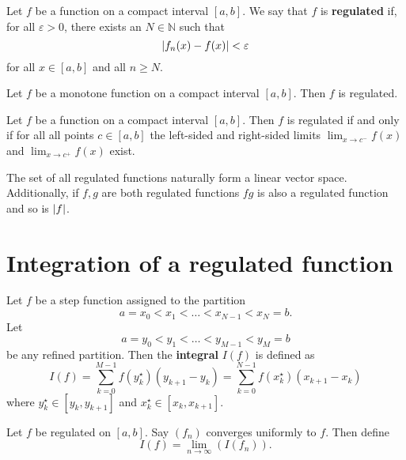 \begin{definition}
    Let $f$ be a function on a compact interval $[a, b]$. We say that $f$ is \textbf{regulated} if, for all $\varepsilon > 0$, there exists an $N \in \mathbb N$ such that \[ \lvert f_n(x) - f(x)\rvert < \varepsilon \] for all $x \in [a, b]$ and all $n \geq N$.
\end{definition}

\begin{proposition}
    Let $f$ be a monotone function on a compact interval $[a, b]$. Then $f$ is regulated.
\end{proposition}

\begin{theorem}
    Let $f$ be a function on a compact interval $[a, b]$. Then $f$ is regulated if and only if for all all points $c \in [a, b]$ the left-sided and right-sided limits $\lim_{x \to c^-} f(x)$ and $\lim_{x \to c^+} f(x)$ exist. 
\end{theorem}

\begin{proposition}
    The set of all regulated functions naturally form a linear vector space. Additionally, if $f, g$ are both regulated functions $fg$ is also a regulated function and so is $\lvert f\rvert$.
\end{proposition}

\section{Integration of a regulated function}

\begin{definition}
    Let $f$ be a step function assigned to the partition \[ a = x_0 < x_1 < \ldots < x_{N-1} < x_N = b. \] Let \[ a = y_0 < y_1 < \ldots < y_{M-1} < y_M = b \] be any refined partition. Then the \textbf{integral} $I(f)$ is defined as \[ I(f) = \sum_{k = 0}^{M-1} f(y^{\star}_k) (y_{k+1} - y_k) = \sum_{k = 0}^{N-1} f(x^{\star}_k) (x_{k+1} - x_k) \] where $y^{\star}_k \in [y_k, y_{k + 1}]$ and $x^{\star}_k \in [x_k, x_{k + 1}]$.
\end{definition}

\begin{definition}
    Let $f$ be regulated on $[a, b]$. Say $(f_n)$ converges uniformly to $f$. Then define \[ I(f) = \lim_{n \to \infty} (I(f_n)). \]    
\end{definition}

